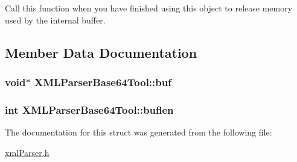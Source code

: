 Call this function when you have finished using this object to release memory used by the internal buffer. 



\subsection{Member Data Documentation}
\hypertarget{structXMLParserBase64Tool_ad20588e28651b5c7b2d92baf284ea237}{
\subsubsection[{buf}]{\setlength{\rightskip}{0pt plus 5cm}void$\ast$ X\-M\-L\-Parser\-Base64\-Tool\-::buf\hspace{0.3cm}{\ttfamily [private]}}}\label{structXMLParserBase64Tool_ad20588e28651b5c7b2d92baf284ea237}
\hypertarget{structXMLParserBase64Tool_aa86710e29c87e2d78d6f4eacf74b854d}{
\subsubsection[{buflen}]{\setlength{\rightskip}{0pt plus 5cm}int X\-M\-L\-Parser\-Base64\-Tool\-::buflen\hspace{0.3cm}{\ttfamily [private]}}}\label{structXMLParserBase64Tool_aa86710e29c87e2d78d6f4eacf74b854d}


The documentation for this struct was generated from the following file\-:\begin{DoxyCompactItemize}
\item 
\hyperlink{xmlParser_8h}{xml\-Parser.\-h}\end{DoxyCompactItemize}
